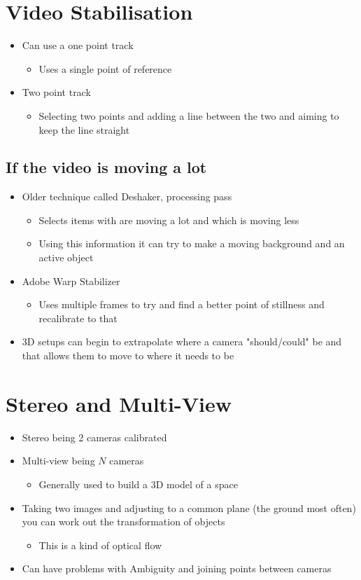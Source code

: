 \documentclass[a4paper]{article}
\begin{document}
\section{Video Stabilisation}
\label{sec-5}
\begin{itemize}
\item Can use a one point track 
\begin{itemize}
\item Uses a single point of reference
\end{itemize}
\item Two point track
\begin{itemize}
\item Selecting two points and adding a line between the two and aiming to keep the line straight
\end{itemize}
\end{itemize}

\subsection{If the video is moving a lot}
\label{sec-5-1}
\begin{itemize}
\item Older technique called Deshaker, processing pass
\begin{itemize}
\item Selects items with are moving a lot and which is moving less
\item Using this information it can try to make a moving background and an active object
\end{itemize}
\item Adobe Warp Stabilizer
\begin{itemize}
\item Uses multiple frames to try and find a better point of stillness and recalibrate to that
\end{itemize}
\item 3D setups can begin to extrapolate where a camera "should/could" be and that allows them to move to where it needs to be
\end{itemize}
\section{Stereo and Multi-View}
\label{sec-6}
\begin{itemize}
\item Stereo being 2 cameras calibrated
\item Multi-view being $N$ cameras
\begin{itemize}
\item Generally used to build a 3D model of a space
\end{itemize}
\item Taking two images and adjusting to a common plane (the ground most often) you can work out the transformation of objects
\begin{itemize}
\item This is a kind of optical flow
\end{itemize}
\item Can have problems with Ambiguity and joining points between cameras
\end{itemize}
\end{document}
